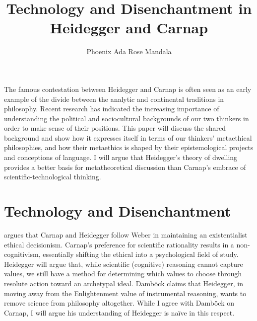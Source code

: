 \documentclass[leqno, 12pt]{turabian-researchpaper}
\title{Technology and Disenchantment in Heidegger and Carnap}
\author{Phoenix Ada Rose Mandala}
\begin{document}
	\maketitle

	The famous contestation between Heidegger and Carnap is often seen as an early
	example of the divide between the analytic and continental traditions in
	philosophy. Recent research has indicated the increasing importance of understanding
	the political and sociocultural backgrounds of our two thinkers in order to make
	sense of their positions. This paper will discuss the shared background and
	show how it expresses itself in terms of our thinkers' metaethical philosophies,
	and how their metaethics is shaped by their epistemological projects and
	conceptions of language. I will argue that Heidegger's theory of dwelling provides
	a better basis for metatheoretical discussion than Carnap's embrace of scientific-technological
	thinking.

	\section{Technology and Disenchantment}

	\autocite{dambock2022} argues that Carnap and Heidegger follow Weber in maintaining
	an existentialist ethical decisionism. Carnap's preference for scientific
	rationality results in a non-cognitivism, essentially shifting the ethical into
	a psychological field of study. Heidegger will argue that, while scientific (cognitive)
	reasoning cannot capture values, we still have a method for determining which
	values to choose through resolute action toward an archetypal ideal. Damb\"ock
	claims that Heidegger, in moving away from the Enlightenment value of
	instrumental reasoning, wants to remove science from philosophy altogether.
	While I agree with Damb\"ock on Carnap, I will argue his understanding of Heidegger
	is na\"ive in this respect.
\end{document}
